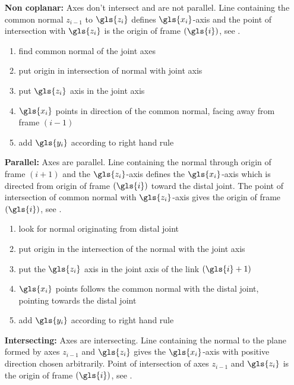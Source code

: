 \begin{itemize}[wide=\parindent] %
	\item[\textbf{Non coplanar:}] Axes don't intersect and are not parallel. Line containing the common normal $z_{i-1}$ to $\gls{z_i}$ defines $\gls{x_i}$-axis and the point of intersection with $\gls{z_i}$ is the origin of frame $(\gls{i})$, see .
	\begin{enumerate}[label=\emph{\alph*)}]
		\item find common normal of the joint axes
		\item put origin in intersection of normal with joint axis
		\item put $\gls{z_i}$ axis in the joint axis
		\item $\gls{x_i}$ points in direction of the common normal, facing away from frame $(i-1)$
		\item add $\gls{y_i}$ according to right hand rule
	\end{enumerate}
	\item[\textbf{Parallel:}] Axes are parallel. Line containing the normal through origin of frame $(i+1)$ and the $\gls{z_i}$-axis defines the $\gls{x_i}$-axis which is directed from origin of frame $(\gls{i})$ toward the distal joint. The point of intersection of common normal with $\gls{z_i}$-axis gives the origin of frame $(\gls{i})$, see . %
	\begin{enumerate}[label=\emph{\alph*)}]
		\item look for normal originating from distal joint
		\item put origin in the intersection of the normal with the joint axis
		\item put the $\gls{z_i}$ axis in the joint axis of the link $(\gls{i}+1)$ 
		\item $\gls{x_i}$ points follows the common normal with the distal joint, pointing towards the distal joint
		\item add $\gls{y_i}$ according to right hand rule
	\end{enumerate}
	\item[\textbf{Intersecting:}] Axes are intersecting. Line containing the normal to the plane formed by axes $z_{i-1}$ and  $\gls{z_i}$ gives the $\gls{x_i}$-axis with positive direction chosen arbitrarily. Point of intersection of  axes $z_{i-1}$  and  $\gls{z_i}$ is the origin of frame $(\gls{i})$, see .

\end{itemize}
